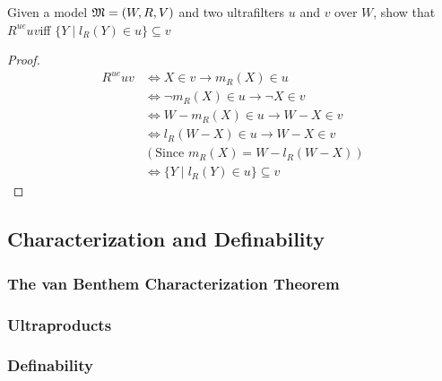 \documentclass[11pt]{article}
\begin{document}
\begin{exercise}
\label{ex2.5.5}
Given a model \(\mathfrak{M}=(W,R,V)\) and two ultrafilters \(u\) and \(v\) over
\(W\), show that \(R^{ue}uv\)iff \(\{Y\mid l_R(Y)\in u\}\subseteq v\)
\end{exercise}

\begin{proof}
\begin{align*}
R^{ue}uv&\Leftrightarrow
X\in v\to m_R(X)\in u\\
&\Leftrightarrow \neg m_R(X)\in u\to \neg X\in v \\
&\Leftrightarrow W-m_R(X)\in u\to W-X\in v\\
&\Leftrightarrow l_R(W-X)\in u\to W-X\in v\\
&(\text{Since }m_R(X)=W-l_R(W-X))\\
&\Leftrightarrow\{Y\mid l_R(Y)\in u\}\subseteq v
\end{align*}
\end{proof}
\subsection{Characterization and Definability}
\label{sec:org441dc65}
\subsubsection{The van Benthem Characterization Theorem}
\label{sec:org7839c38}
\subsubsection{Ultraproducts}
\label{sec:orgd396cab}
\subsubsection{Definability}
\label{sec:org67f74bb}
\end{document}
